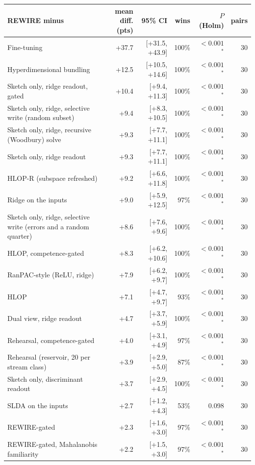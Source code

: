 \begin{tabular*}{\textwidth}{@{\extracolsep{\fill}}lrrrrr@{}}
\toprule
REWIRE minus & mean diff. (pts) & 95\% CI & wins & $P$ (Holm) & pairs \\
\midrule
Fine-tuning & +37.7 & [+31.5, +43.9] & 100\% & $<0.001$$^{*}$ & 30 \\
Hyperdimensional bundling & +12.5 & [+10.5, +14.6] & 100\% & $<0.001$$^{*}$ & 30 \\
Sketch only, ridge readout, gated & +10.4 & [+9.4, +11.3] & 100\% & $<0.001$$^{*}$ & 30 \\
Sketch only, ridge, selective write (random subset) & +9.4 & [+8.3, +10.5] & 100\% & $<0.001$$^{*}$ & 30 \\
Sketch only, ridge, recursive (Woodbury) solve & +9.3 & [+7.7, +11.1] & 100\% & $<0.001$$^{*}$ & 30 \\
Sketch only, ridge readout & +9.3 & [+7.7, +11.1] & 100\% & $<0.001$$^{*}$ & 30 \\
HLOP-R (subspace refreshed) & +9.2 & [+6.6, +11.8] & 100\% & $<0.001$$^{*}$ & 30 \\
Ridge on the inputs & +9.0 & [+5.9, +12.5] & 97\% & $<0.001$$^{*}$ & 30 \\
Sketch only, ridge, selective write (errors and a random quarter) & +8.6 & [+7.6, +9.6] & 100\% & $<0.001$$^{*}$ & 30 \\
HLOP, competence-gated & +8.3 & [+6.2, +10.6] & 100\% & $<0.001$$^{*}$ & 30 \\
RanPAC-style (ReLU, ridge) & +7.9 & [+6.2, +9.7] & 100\% & $<0.001$$^{*}$ & 30 \\
HLOP & +7.1 & [+4.7, +9.7] & 93\% & $<0.001$$^{*}$ & 30 \\
Dual view, ridge readout & +4.7 & [+3.7, +5.9] & 100\% & $<0.001$$^{*}$ & 30 \\
Rehearsal, competence-gated & +4.0 & [+3.1, +4.9] & 97\% & $<0.001$$^{*}$ & 30 \\
Rehearsal (reservoir, 20 per stream class) & +3.9 & [+2.9, +5.0] & 87\% & $<0.001$$^{*}$ & 30 \\
Sketch only, discriminant readout & +3.7 & [+2.9, +4.5] & 100\% & $<0.001$$^{*}$ & 30 \\
SLDA on the inputs & +2.7 & [+1.2, +4.3] & 53\% & 0.098 & 30 \\
REWIRE-gated & +2.3 & [+1.6, +3.0] & 97\% & $<0.001$$^{*}$ & 30 \\
REWIRE-gated, Mahalanobis familiarity & +2.2 & [+1.5, +3.0] & 97\% & $<0.001$$^{*}$ & 30 \\

\end{tabular*}
